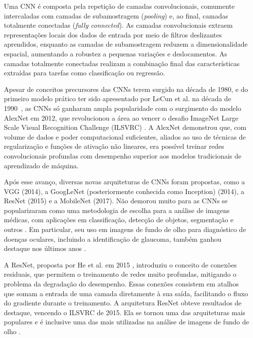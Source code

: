 \documentclass[12pt]{article}
\begin{document}
Uma CNN é composta pela repetição de camadas convolucionais, comumente intercaladas com camadas de subamostragem (\emph{pooling}) e, ao final, camadas totalmente conectadas (\emph{fully connected}). As camadas convolucionais extraem representações locais dos dados de entrada por meio de filtros deslizantes aprendidos, enquanto as camadas de subamostragem reduzem a dimensionalidade espacial, aumentando a robustez a pequenas variações e deslocamentos. \cite{goodfellow2016} As camadas totalmente conectadas realizam a combinação final das características extraídas para tarefas como classificação ou regressão.

Apesar de conceitos precursores das CNNs terem surgido na década de 1980, e do primeiro modelo prático ter sido apresentado por LeCun et al. na década de 1990~\cite{lecun1998gradient}, as CNNs só ganharam ampla popularidade com o surgimento do modelo AlexNet em 2012, que revolucionou a área ao vencer o desafio ImageNet Large Scale Visual Recognition Challenge (ILSVRC) \cite{krizhevsky2012imagenet}. A AlexNet demonstrou que, com volume de dados e poder computacional suficientes, aliados ao uso de técnicas de regularização e funções de ativação não lineares, era possível treinar redes convolucionais profundas com desempenho superior aos modelos tradicionais de aprendizado de máquina.

Após esse avanço, diversas novas arquiteturas de CNNs foram propostas, como a VGG \cite{simonyan2015very} (2014), a GoogLeNet (posteriormente conhecida como Inception) \cite{szegedy2015going} (2014), a ResNet \cite{he2016deep} (2015) e a MobileNet \cite{howard2017mobilenet} (2017). Não demorou muito para as CNNs se popularizaram como uma metodologia de escolha para a análise de imagens médicas, com aplicações em classificação, detecção de objetos, segmentação e outros \cite{litjens_2017}. Em particular, seu uso em imagens de fundo de olho para diagnóstico de doenças oculares, incluindo a identificação de glaucoma, também ganhou destaque nos últimos anos \cite{li_review_2021}.

A ResNet, proposta por He et al. em 2015 \cite{he2016deep}, introduziu o conceito de conexões residuais, que permitem o treinamento de redes muito profundas, mitigando o problema da degradação do desempenho. Essas conexões consistem em atalhos que somam a entrada de uma camada diretamente à sua saída, facilitando o fluxo do gradiente durante o treinamento. A arquitetura ResNet obteve resultados de destaque, vencendo o ILSVRC de 2015. Ela se tornou uma das arquiteturas mais populares e é inclusive uma das mais utilizadas na análise de imagens de fundo de olho \cite{li_review_2021}.
\end{document}
